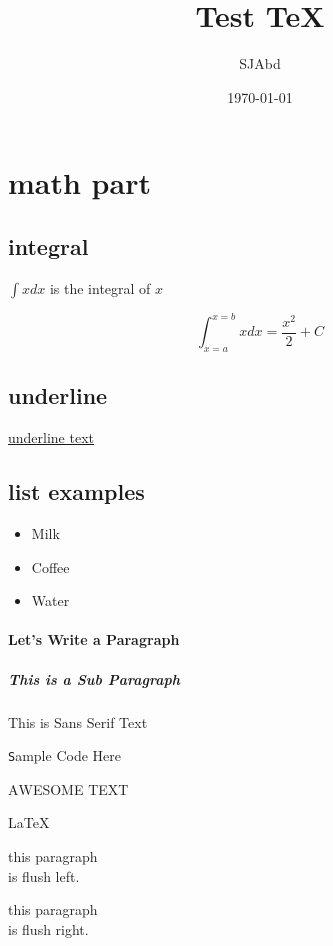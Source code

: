 \documentclass{article}
\title{Test TeX}
\author{SJAbd}
\date{\today}
\begin{document}
\maketitle
\tableofcontents


\section{math part}


\subsection {integral}
$\int x dx$ is the integral of $x$

\begin{equation}
\int_{x=a}^{x=b} x dx = \frac{x^2}{2}+C
\end{equation}


\subsection{underline}
\underline {underline text}


\subsection{list examples}
\begin{itemize}
\item Milk
\item Coffee
\item Water
\end{itemize}

\newpage

\paragraph{
Let's Write a Paragraph
}
\subparagraph{
This is a Sub Paragraph\newline
}

\textsf This is Sans Serif Text

\texttt Sample Code Here 

\textsc AWESOME TEXT

\LaTeX

\begin{flushleft}
this paragraph \\
is flush left.
\end{flushleft}

\begin{flushright}
this paragraph \\
is flush right.
\end{flushright}
\end{document}
